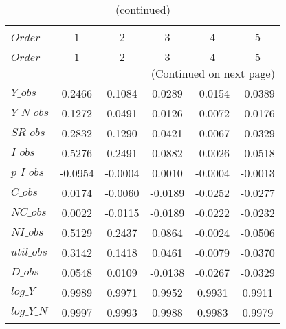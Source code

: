  
\begin{center}
\begin{longtable}{lccccc} 
\caption{COEFFICIENTS OF AUTOCORRELATION}\\
 \label{Table:th_autocorr_matrix}\\
\toprule 
$Order      $	 & 	 $          1$	 & 	 $          2$	 & 	 $          3$	 & 	 $          4$	 & 	 $          5$\\
\midrule \endfirsthead 
\caption{(continued)}\\
 \toprule \\ 
$Order      $	 & 	 $          1$	 & 	 $          2$	 & 	 $          3$	 & 	 $          4$	 & 	 $          5$\\
\midrule \endhead 
\midrule \multicolumn{6}{r}{(Continued on next page)} \\ \bottomrule \endfoot 
\bottomrule \endlastfoot 
$Y\_obs     $	 & 	     0.2466	 & 	     0.1084	 & 	     0.0289	 & 	    -0.0154	 & 	    -0.0389 \\ 
$Y\_N\_obs  $	 & 	     0.1272	 & 	     0.0491	 & 	     0.0126	 & 	    -0.0072	 & 	    -0.0176 \\ 
$SR\_obs    $	 & 	     0.2832	 & 	     0.1290	 & 	     0.0421	 & 	    -0.0067	 & 	    -0.0329 \\ 
$I\_obs     $	 & 	     0.5276	 & 	     0.2491	 & 	     0.0882	 & 	    -0.0026	 & 	    -0.0518 \\ 
$p\_I\_obs  $	 & 	    -0.0954	 & 	    -0.0004	 & 	     0.0010	 & 	    -0.0004	 & 	    -0.0013 \\ 
$C\_obs     $	 & 	     0.0174	 & 	    -0.0060	 & 	    -0.0189	 & 	    -0.0252	 & 	    -0.0277 \\ 
$NC\_obs    $	 & 	     0.0022	 & 	    -0.0115	 & 	    -0.0189	 & 	    -0.0222	 & 	    -0.0232 \\ 
$NI\_obs    $	 & 	     0.5129	 & 	     0.2437	 & 	     0.0864	 & 	    -0.0024	 & 	    -0.0506 \\ 
$util\_obs  $	 & 	     0.3142	 & 	     0.1418	 & 	     0.0461	 & 	    -0.0079	 & 	    -0.0370 \\ 
$D\_obs     $	 & 	     0.0548	 & 	     0.0109	 & 	    -0.0138	 & 	    -0.0267	 & 	    -0.0329 \\ 
$log\_Y     $	 & 	     0.9989	 & 	     0.9971	 & 	     0.9952	 & 	     0.9931	 & 	     0.9911 \\ 
$log\_Y\_N  $	 & 	     0.9997	 & 	     0.9993	 & 	     0.9988	 & 	     0.9983	 & 	     0.9979 \\ 

\end{longtable}
\end{center}
